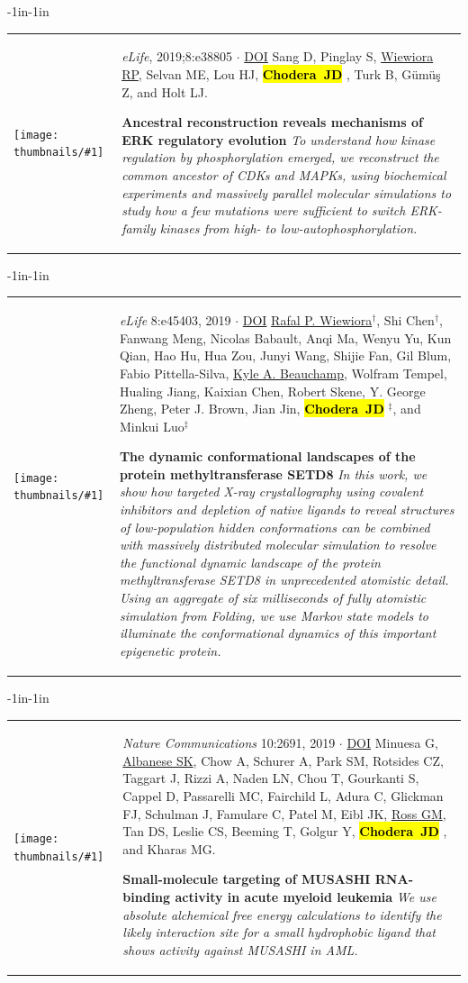 \documentclass[10pt]{article}
\newcommand{\newarticle}[7]{
\begin{adjustwidth}{-1in}{-1in}  
\begin{tabular}{p{0.9in}p{7in}}
\parbox[c]{0.9in}{\texttt{[image: thumbnails/\#1]}} & \parbox[c]{6in}{\setstretch{0.9} {\small #4} $\cdot$ \href{#6}{#5} \\ {\footnotesize {#2}} \\ \raggedright { \bf\nohyphens{#3}}  \\ {\footnotesize\emph {#7}}} %
\end{tabular}
\end{adjustwidth}
\vspace{0.2in}
}
\newcommand{\jdc}{ {\bf \hl{Chodera~JD}} } %
\begin{document}
\newarticle{erk-reconstruction}{Sang D, Pinglay S, \underline{Wiewiora RP}, Selvan ME, Lou HJ, \jdc, Turk B, G\"{u}m\"{u}\c{s} Z, and Holt LJ.}{Ancestral reconstruction reveals mechanisms of ERK regulatory evolution}{\emph{eLife}, 2019;8:e38805}{DOI}{https://doi.org/10.7554/eLife.38805.001}{To understand how kinase regulation by phosphorylation emerged, we reconstruct the common ancestor of CDKs and MAPKs, using biochemical experiments and massively parallel molecular simulations to study how a few mutations were sufficient to switch ERK-family kinases from high- to low-autophosphorylation.}

\newarticle{setd8-msm}{\underline{Rafal P. Wiewiora}$^\dag$, Shi Chen$^\dag$, Fanwang Meng, Nicolas Babault, Anqi Ma, Wenyu Yu, Kun Qian, Hao Hu, Hua Zou, Junyi Wang, Shijie Fan, Gil Blum, Fabio Pittella-Silva, \underline{Kyle A. Beauchamp}, Wolfram Tempel, Hualing Jiang, Kaixian Chen, Robert Skene, Y. George Zheng, Peter J. Brown, Jian Jin, \jdc$^\ddag$, and Minkui Luo$^\ddag$}{The dynamic conformational landscapes of the protein methyltransferase SETD8}{\emph{eLife} 8:e45403, 2019}{DOI}{http://doi.org/10.7554/eLife.45403}{In this work, we show how targeted X-ray crystallography using covalent inhibitors and depletion of native ligands to reveal structures of low-population hidden conformations can be combined with massively distributed molecular simulation to resolve the functional dynamic landscape of the protein methyltransferase SETD8 in unprecedented atomistic detail. Using an aggregate of six milliseconds of fully atomistic simulation from Folding\@home, we use Markov state models to illuminate the conformational dynamics of this important epigenetic protein.}

\newarticle{musashi}{Minuesa G, \underline{Albanese SK}, Chow A, Schurer A, Park SM, Rotsides CZ, Taggart J, Rizzi A, Naden LN, Chou T, Gourkanti S, Cappel D, Passarelli MC, Fairchild L, Adura C, Glickman FJ, Schulman J, Famulare C, Patel M, Eibl JK, \underline{Ross GM}, Tan DS, Leslie CS, Beeming T, Golgur Y, \jdc, and Kharas MG. }{Small-molecule targeting of MUSASHI RNA-binding activity in acute myeloid leukemia}{\emph{Nature Communications} 10:2691, 2019}{DOI}{https://doi.org/10.1038/s41467-019-10523-3}{We use absolute alchemical free energy calculations to identify the likely interaction site for a small hydrophobic ligand that shows activity against MUSASHI in AML.}

\end{document}
